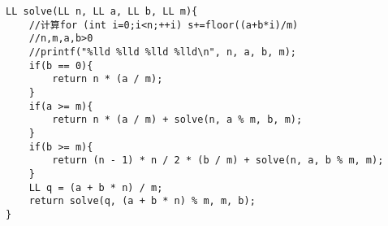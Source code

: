 \begin{lstlisting}
LL solve(LL n, LL a, LL b, LL m){
	//计算for (int i=0;i<n;++i) s+=floor((a+b*i)/m)
	//n,m,a,b>0
	//printf("%lld %lld %lld %lld\n", n, a, b, m);
	if(b == 0){
		return n * (a / m);
	}
	if(a >= m){
		return n * (a / m) + solve(n, a % m, b, m);
	}
	if(b >= m){
		return (n - 1) * n / 2 * (b / m) + solve(n, a, b % m, m);
	}
	LL q = (a + b * n) / m;
	return solve(q, (a + b * n) % m, m, b);
}
\end{lstlisting}
